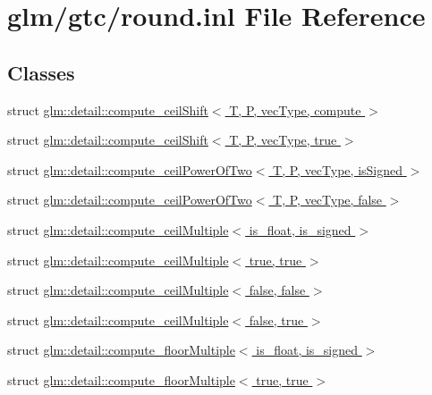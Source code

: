 \hypertarget{round_8inl}{\section{glm/gtc/round.inl File Reference}
\label{round_8inl}
}
\subsection*{Classes}
\begin{DoxyCompactItemize}
\item 
struct \hyperlink{structglm_1_1detail_1_1compute__ceilShift}{glm\-::detail\-::compute\-\_\-ceil\-Shift$<$ T, P, vec\-Type, compute $>$}
\item 
struct \hyperlink{structglm_1_1detail_1_1compute__ceilShift_3_01T_00_01P_00_01vecType_00_01true_01_4}{glm\-::detail\-::compute\-\_\-ceil\-Shift$<$ T, P, vec\-Type, true $>$}
\item 
struct \hyperlink{structglm_1_1detail_1_1compute__ceilPowerOfTwo}{glm\-::detail\-::compute\-\_\-ceil\-Power\-Of\-Two$<$ T, P, vec\-Type, is\-Signed $>$}
\item 
struct \hyperlink{structglm_1_1detail_1_1compute__ceilPowerOfTwo_3_01T_00_01P_00_01vecType_00_01false_01_4}{glm\-::detail\-::compute\-\_\-ceil\-Power\-Of\-Two$<$ T, P, vec\-Type, false $>$}
\item 
struct \hyperlink{structglm_1_1detail_1_1compute__ceilMultiple}{glm\-::detail\-::compute\-\_\-ceil\-Multiple$<$ is\-\_\-float, is\-\_\-signed $>$}
\item 
struct \hyperlink{structglm_1_1detail_1_1compute__ceilMultiple_3_01true_00_01true_01_4}{glm\-::detail\-::compute\-\_\-ceil\-Multiple$<$ true, true $>$}
\item 
struct \hyperlink{structglm_1_1detail_1_1compute__ceilMultiple_3_01false_00_01false_01_4}{glm\-::detail\-::compute\-\_\-ceil\-Multiple$<$ false, false $>$}
\item 
struct \hyperlink{structglm_1_1detail_1_1compute__ceilMultiple_3_01false_00_01true_01_4}{glm\-::detail\-::compute\-\_\-ceil\-Multiple$<$ false, true $>$}
\item 
struct \hyperlink{structglm_1_1detail_1_1compute__floorMultiple}{glm\-::detail\-::compute\-\_\-floor\-Multiple$<$ is\-\_\-float, is\-\_\-signed $>$}
\item 
struct \hyperlink{structglm_1_1detail_1_1compute__floorMultiple_3_01true_00_01true_01_4}{glm\-::detail\-::compute\-\_\-floor\-Multiple$<$ true, true $>$}
\item 

\end{DoxyCompactItemize}
